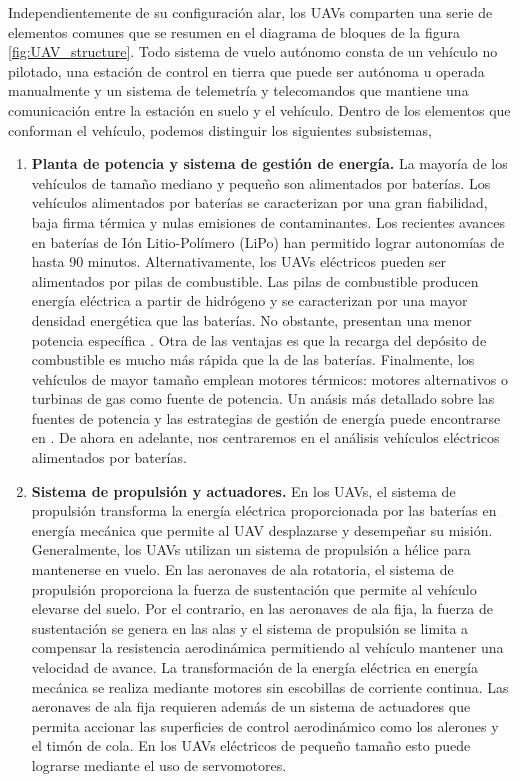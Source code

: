 \documentclass[a4paper,12pt]{book}
\begin{document}
Independientemente de su configuración alar, los UAVs comparten una serie de elementos comunes que se resumen en el diagrama de bloques de la figura \ref{fig:UAV_structure}. Todo sistema de vuelo autónomo consta de un vehículo no pilotado, una estación de control en tierra que puede ser autónoma u operada manualmente y un sistema de telemetría y telecomandos que mantiene una comunicación entre la estación en suelo y el vehículo. Dentro de los elementos que conforman el vehículo, podemos distinguir los siguientes subsistemas,
\begin{enumerate}
    \item \textbf{Planta de potencia y sistema de gestión de energía.} La mayoría de los vehículos de tamaño mediano y pequeño son alimentados por baterías. Los vehículos alimentados por baterías se caracterizan por una gran fiabilidad, baja firma térmica y nulas emisiones de contaminantes. Los recientes avances en baterías de Ión Litio-Polímero (LiPo) han permitido lograr autonomías de hasta 90 minutos. Alternativamente, los UAVs eléctricos pueden ser alimentados por pilas de combustible. Las pilas de combustible producen energía eléctrica a partir de hidrógeno y se caracterizan por una mayor densidad energética que las baterías. No obstante, presentan una menor potencia específica \cite{boukoberine2019critical}. Otra de las ventajas es que la recarga del depósito de combustible es mucho más rápida que la de las baterías. Finalmente, los vehículos de mayor tamaño emplean motores térmicos: motores alternativos o turbinas de gas como fuente de potencia. Un anásis más detallado sobre las fuentes de potencia y las estrategias de gestión de energía puede encontrarse en \cite{boukoberine2019critical}. De ahora en adelante, nos centraremos en el análisis vehículos eléctricos alimentados por baterías. 
    
    \item \textbf{Sistema de propulsión y actuadores.} En los UAVs, el sistema de propulsión transforma la energía eléctrica proporcionada por las baterías en energía mecánica que permite al UAV desplazarse y desempeñar su misión. Generalmente, los UAVs utilizan un sistema de propulsión a hélice para mantenerse en vuelo. En las aeronaves de ala rotatoria, el sistema de propulsión proporciona la fuerza de sustentación que permite al vehículo elevarse del suelo. Por el contrario, en las aeronaves de ala fija, la fuerza de sustentación se genera en las alas y el sistema de propulsión se limita a compensar la resistencia aerodinámica permitiendo al vehículo mantener una velocidad de avance. La transformación de la energía eléctrica en energía mecánica se realiza mediante motores sin escobillas de corriente continua. Las aeronaves de ala fija requieren además de un sistema de actuadores que permita accionar las superficies de control aerodinámico como los alerones y el timón de cola. En los UAVs eléctricos de pequeño tamaño esto puede lograrse mediante el uso de servomotores.
    

\end{enumerate}
\end{document}
